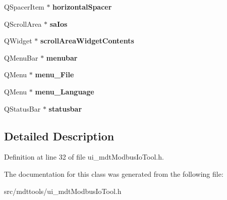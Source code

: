 \begin{DoxyCompactItemize}
\item 
\hypertarget{class_ui__mdt_modbus_io_tool_a66418b60c043ae70465930e69e88e63b}{
QSpacerItem $\ast$ {\bfseries horizontalSpacer}}
\label{class_ui__mdt_modbus_io_tool_a66418b60c043ae70465930e69e88e63b}

\item 
\hypertarget{class_ui__mdt_modbus_io_tool_a0193061f662939b755bc31832269dd02}{
QScrollArea $\ast$ {\bfseries saIos}}
\label{class_ui__mdt_modbus_io_tool_a0193061f662939b755bc31832269dd02}

\item 
\hypertarget{class_ui__mdt_modbus_io_tool_a624d93d5697ab5ba75269494cc888207}{
QWidget $\ast$ {\bfseries scrollAreaWidgetContents}}
\label{class_ui__mdt_modbus_io_tool_a624d93d5697ab5ba75269494cc888207}

\item 
\hypertarget{class_ui__mdt_modbus_io_tool_a101030af93eae77dc80e69c6ad73b561}{
QMenuBar $\ast$ {\bfseries menubar}}
\label{class_ui__mdt_modbus_io_tool_a101030af93eae77dc80e69c6ad73b561}

\item 
\hypertarget{class_ui__mdt_modbus_io_tool_acfa5d67840ed8009e81284b8383cca18}{
QMenu $\ast$ {\bfseries menu\_\-File}}
\label{class_ui__mdt_modbus_io_tool_acfa5d67840ed8009e81284b8383cca18}

\item 
\hypertarget{class_ui__mdt_modbus_io_tool_a94583261b88e08ca386b793ff6133b0a}{
QMenu $\ast$ {\bfseries menu\_\-Language}}
\label{class_ui__mdt_modbus_io_tool_a94583261b88e08ca386b793ff6133b0a}

\item 
\hypertarget{class_ui__mdt_modbus_io_tool_a067095b9a1197506ba66e11e40f195fb}{
QStatusBar $\ast$ {\bfseries statusbar}}
\label{class_ui__mdt_modbus_io_tool_a067095b9a1197506ba66e11e40f195fb}

\end{DoxyCompactItemize}


\subsection{Detailed Description}


Definition at line 32 of file ui\_\-mdtModbusIoTool.h.



The documentation for this class was generated from the following file:\begin{DoxyCompactItemize}
\item 
src/mdttools/ui\_\-mdtModbusIoTool.h\end{DoxyCompactItemize}
